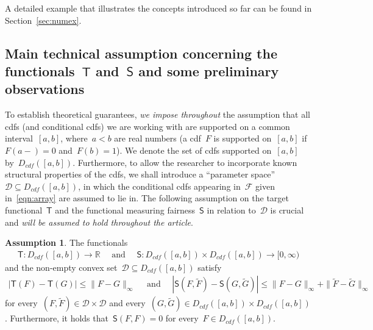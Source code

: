 \documentclass[11pt, a4paper]{article}
\newcommand{\R}{\mathbb{R}}
\theoremstyle{definition}
\newtheorem{assumption}{Assumption}[section]
\begin{document}
A detailed example that illustrates the concepts introduced so far can be found in Section~\ref{sec:numex}.

\subsection{Main technical assumption concerning the functionals~$\mathsf{T}$ and~$\mathsf{S}$ and some preliminary observations}

To establish theoretical guarantees, \emph{we impose throughout} the assumption that all cdfs (and conditional cdfs) we are working with are supported on a common interval~$[a, b]$, where~$a < b$ are real numbers (a cdf~$F$ is supported on~$[a,b]$ if~$F(a-) = 0$ and~$F(b) = 1$). We denote the set of cdfs supported on~$[a,b]$ by~$D_{cdf}([a,b])$. Furthermore, to allow the researcher to incorporate known structural properties of the cdfs, we shall introduce a ``parameter space''~$\mathscr{D} \subseteq D_{cdf}([a,b])$, in which the conditional cdfs appearing in~$\mathcal{F}$ given in~\eqref{eqn:array} are assumed to lie in. The following assumption on the target functional~$\mathsf{T}$ and the functional measuring fairness~$\mathsf{S}$ in relation to~$\mathscr{D}$ is crucial and \emph{will be assumed to hold throughout the article}.

\begin{assumption}\label{as:MAIN}
The functionals
\begin{equation}\label{eqn:functs}
\begin{aligned}
\mathsf{T}: D_{cdf}([a,b]) \to \R \quad \text{ and } \quad
\mathsf{S}:  D_{cdf}([a,b]) \times  D_{cdf}([a,b]) \to [0, \infty)
\end{aligned} 
\end{equation}
%
and the non-empty convex set~$\mathscr{D} \subseteq D_{cdf}([a,b])$ satisfy 
%
\begin{equation}\label{eqn:lipcondAS}
\begin{aligned}
|\mathsf{T}(F) - \mathsf{T}(G)| \leq \|F- G\|_{\infty} \quad \text{ and } \quad |\mathsf{S}(F, \tilde{F}) - \mathsf{S}(G, \tilde{G})|\leq \|F- G\|_{\infty} + \|\tilde{F}- \tilde{G}\|_{\infty}
\end{aligned}
\end{equation}
%
for every~$(F, \tilde{F}) \in \mathscr{D} \times \mathscr{D}$ and every~$(G, \tilde{G}) \in D_{cdf}([a,b]) \times D_{cdf}([a,b])$. Furthermore, it holds that~$\mathsf{S}(F, F) = 0$ for every~$F \in D_{cdf}([a,b])$. 
\end{assumption}
\end{document}
